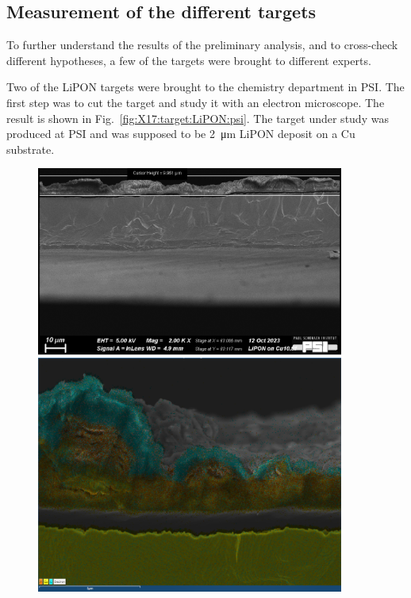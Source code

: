 \begin{refsection}
    \section{Measurement of the different targets}
        To further understand the results of the preliminary analysis, and to cross-check different hypotheses, a few of the targets were brought to different experts.
        \begin{outline}
            \1 Two of the LiPON targets were brought to the chemistry department in PSI. The first step was to cut the target and study it with an electron microscope.
            The result is shown in Fig.~\ref{fig:X17:target:LiPON:psi}.
            The target under study was produced at PSI and was supposed to be \SI{2}{\micro m} LiPON deposit on a Cu substrate.
        \end{outline}
        \begin{figure}
            \centering
            \includegraphics[width = 0.9\textwidth]{Figures/X17/PSI_LiPON_picture.png}
            \includegraphics[width = 0.9\textwidth]{Figures/X17/PSI_LiPON-atoms_picture.PNG}

\end{figure}
\end{refsection}
